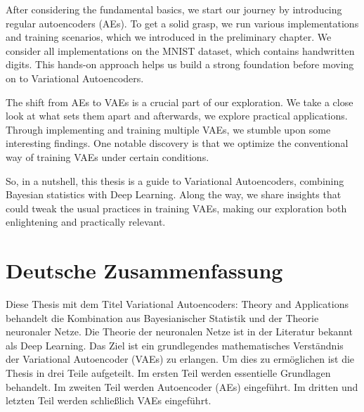 \documentclass[11pt, twoside, a4paper]{book}
\theoremstyle{plain}
\theoremstyle{definition}
\theoremstyle{plain}
\begin{document}
After considering the fundamental basics, we start our journey by introducing regular autoencoders (AEs). To get a solid grasp, we run various implementations and training scenarios, which we introduced in the preliminary chapter. We consider all implementations on the MNIST dataset, which contains handwritten digits. This hands-on approach helps us build a strong foundation before moving on to Variational Autoencoders.

The shift from AEs to VAEs is a crucial part of our exploration. We take a close look at what sets them apart and afterwards, we explore practical applications. Through implementing and training multiple VAEs, we stumble upon some interesting findings. One notable discovery is that we optimize the conventional way of training VAEs under certain conditions.

So, in a nutshell, this thesis is a guide to Variational Autoencoders, combining Bayesian statistics with Deep Learning. Along the way, we share insights that could tweak the usual practices in training VAEs, making our exploration both enlightening and practically relevant.








\newpage
{}

\section*{Deutsche Zusammenfassung}
Diese Thesis mit dem Titel \glqq Variational Autoencoders: Theory and Applications\grqq{} behandelt die Kombination aus Bayesianischer Statistik und der Theorie neuronaler Netze. Die Theorie der neuronalen Netze ist in der Literatur bekannt als \glqq Deep Learning\grqq{}. Das Ziel ist ein grundlegendes mathematisches Verständnis der Variational Autoencoder (VAEs) zu erlangen. Um dies zu ermöglichen ist die Thesis in drei Teile aufgeteilt. Im ersten Teil werden essentielle Grundlagen behandelt. Im zweiten Teil werden Autoencoder (AEs) eingeführt. Im dritten und letzten Teil werden schließlich VAEs eingeführt.
\end{document}
